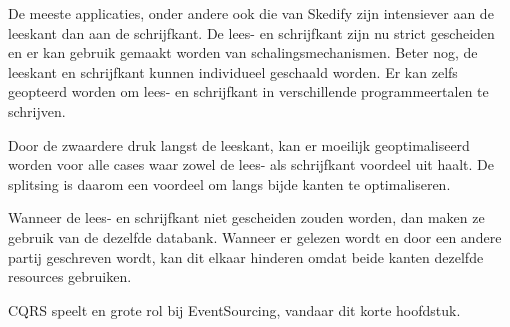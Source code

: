 De meeste applicaties, onder andere ook die van Skedify zijn intensiever aan de leeskant dan aan de schrijfkant. De lees- en schrijfkant zijn nu strict gescheiden en er kan gebruik gemaakt worden van schalingsmechanismen. Beter nog, de leeskant en schrijfkant kunnen individueel geschaald worden. Er kan zelfs geopteerd worden om lees- en schrijfkant in verschillende programmeertalen te schrijven.

Door de zwaardere druk langst de leeskant, kan er moeilijk geoptimaliseerd worden voor alle cases waar zowel de lees- als schrijfkant voordeel uit haalt. De splitsing is daarom een voordeel om langs bijde kanten te optimaliseren.

Wanneer de lees- en schrijfkant niet gescheiden zouden worden, dan maken ze gebruik van de dezelfde databank. Wanneer er gelezen wordt en door een andere partij geschreven wordt, kan dit elkaar hinderen omdat beide kanten dezelfde resources gebruiken.

CQRS speelt en grote rol bij EventSourcing, vandaar dit korte hoofdstuk.